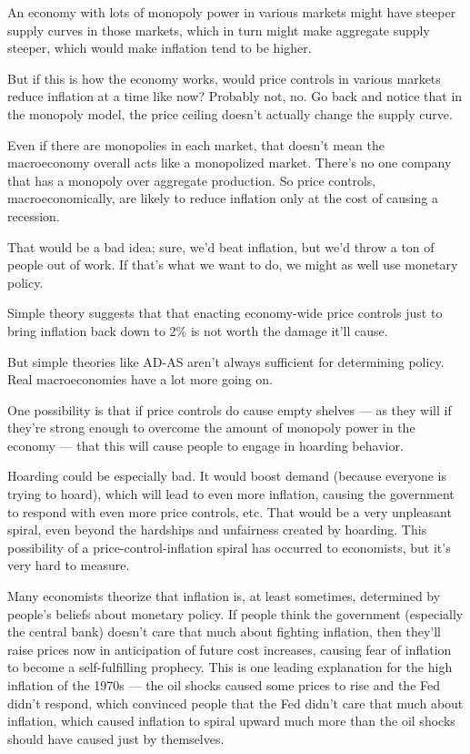 \documentclass[
]{book}
\begin{document}
\href{fig/price_control_inflation.png}{}

An economy with lots of monopoly power in various markets might have steeper supply curves in those markets, which in turn might make aggregate supply steeper, which would make inflation tend to be higher.

But if this is how the economy works, would price controls in various markets reduce inflation at a time like now? Probably not, no. Go back and notice that in the monopoly model, the price ceiling doesn't actually change the supply curve.

Even if there are monopolies in each market, that doesn't mean the macroeconomy overall acts like a monopolized market. There's no one company that has a monopoly over aggregate production. So price controls, macroeconomically, are likely to reduce inflation only at the cost of causing a recession.

That would be a bad idea; sure, we'd beat inflation, but we'd throw a ton of people out of work. If that's what we want to do, we might as well use monetary policy.

Simple theory suggests that that enacting economy-wide price controls just to bring inflation back down to 2\% is not worth the damage it'll cause.

But simple theories like AD-AS aren't always sufficient for determining policy. Real macroeconomies have a lot more going on.

One possibility is that if price controls do cause empty shelves --- as they will if they're strong enough to overcome the amount of monopoly power in the economy --- that this will cause people to engage in hoarding behavior.

Hoarding could be especially bad. It would boost demand (because everyone is trying to hoard), which will lead to even more inflation, causing the government to respond with even more price controls, etc. That would be a very unpleasant spiral, even beyond the hardships and unfairness created by hoarding. This possibility of a price-control-inflation spiral has occurred to economists, but it's very hard to measure.

Many economists theorize that inflation is, at least sometimes, determined by people's beliefs about monetary policy. If people think the government (especially the central bank) doesn't care that much about fighting inflation, then they'll raise prices now in anticipation of future cost increases, causing fear of inflation to become a self-fulfilling prophecy. This is one leading explanation for the high inflation of the 1970s --- the oil shocks caused some prices to rise and the Fed didn't respond, which convinced people that the Fed didn't care that much about inflation, which caused inflation to spiral upward much more than the oil shocks should have caused just by themselves.
\end{document}
